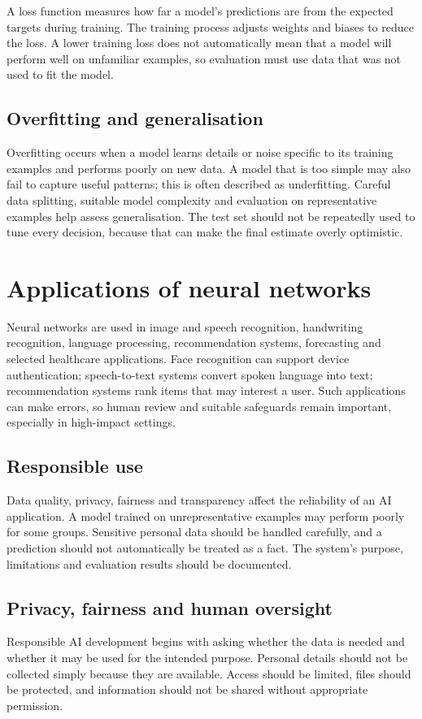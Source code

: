 \documentclass[11pt,openany,oneside]{book}
\begin{document}
A loss function measures how far a model's predictions are from the expected targets during training. The training process adjusts weights and biases to reduce the loss. A lower training loss does not automatically mean that a model will perform well on unfamiliar examples, so evaluation must use data that was not used to fit the model.

\subsection{Overfitting and generalisation}
Overfitting occurs when a model learns details or noise specific to its training examples and performs poorly on new data. A model that is too simple may also fail to capture useful patterns; this is often described as underfitting. Careful data splitting, suitable model complexity and evaluation on representative examples help assess generalisation. The test set should not be repeatedly used to tune every decision, because that can make the final estimate overly optimistic.

\section{Applications of neural networks}
Neural networks are used in image and speech recognition, handwriting recognition, language processing, recommendation systems, forecasting and selected healthcare applications. Face recognition can support device authentication; speech-to-text systems convert spoken language into text; recommendation systems rank items that may interest a user. Such applications can make errors, so human review and suitable safeguards remain important, especially in high-impact settings.

\subsection{Responsible use}
Data quality, privacy, fairness and transparency affect the reliability of an AI application. A model trained on unrepresentative examples may perform poorly for some groups. Sensitive personal data should be handled carefully, and a prediction should not automatically be treated as a fact. The system's purpose, limitations and evaluation results should be documented.

\subsection{Privacy, fairness and human oversight}
Responsible AI development begins with asking whether the data is needed and whether it may be used for the intended purpose. Personal details should not be collected simply because they are available. Access should be limited, files should be protected, and information should not be shared without appropriate permission.
\end{document}
